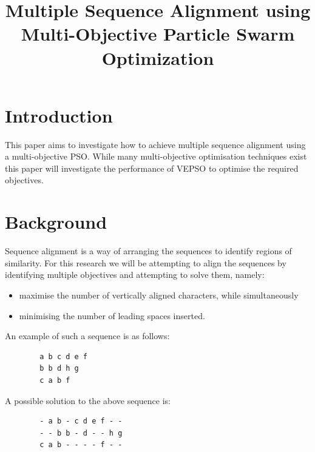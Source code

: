 \documentclass[conference]{IEEEtran}
\begin{document}
\title{Multiple Sequence Alignment using Multi-Objective Particle Swarm Optimization\\
}

\author{
}

\maketitle

\section{Introduction}
This paper aims to investigate how to achieve multiple sequence alignment using a multi-objective \ac{PSO}. While many multi-objective optimisation techniques exist this paper will investigate the performance of \ac{VEPSO} to optimise the required objectives.

\section{Background}
Sequence alignment is a way of arranging the sequences to identify regions of similarity. For this research we will be attempting to align the sequences by identifying multiple objectives and attempting to solve them, namely:
\begin{itemize}
	\item maximise the number of vertically aligned characters, while simultaneously
	\item minimising the number of leading spaces inserted.
\end{itemize}

An example of such a sequence is as follows:
\begin{lstlisting}
        a b c d e f
        b b d h g
        c a b f
\end{lstlisting}

A possible solution to the above sequence is:

\begin{lstlisting}
        - a b - c d e f - -
        - - b b - d - - h g
        c a b - - - - f - -
\end{lstlisting}
\end{document}

